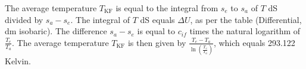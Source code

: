 The average temperature \( T_{\text{KF}} \) is equal to the integral from \( s_e \) to \( s_a \) of \( T \) dS divided by \( s_a - s_e \).
The integral of \( T \) dS equals \( \Delta U \), as per the table (Differential, dm isobaric).
The difference \( s_a - s_e \) is equal to \( c_{if} \) times the natural logarithm of \( \frac{T_e}{T_a} \).
The average temperature \( T_{\text{KF}} \) is then given by \( \frac{T_e - T_a}{\ln \left( \frac{T_e}{T_a} \right)} \), which equals 293.122 Kelvin.